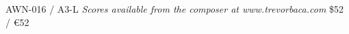 \documentclass{article}
\begin{document}
\null \vfill

AWN-016 / A3-L \hfill
\textit{Scores available from the composer at www.trevorbaca.com}
\hfill \$52 / \euro 52
\end{document}

